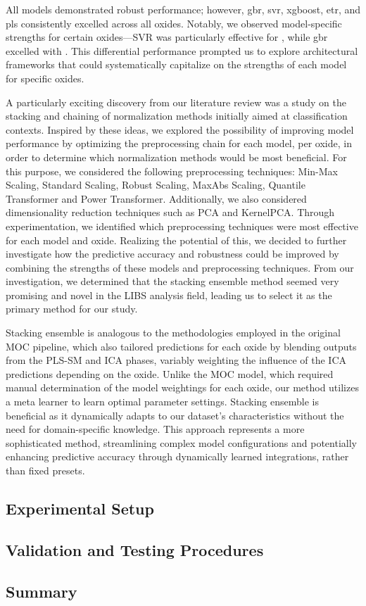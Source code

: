 All models demonstrated robust performance; however, \gls{gbr}, \gls{svr}, \gls{xgboost}, \gls{etr}, and \gls{pls} consistently excelled across all oxides. 
Notably, we observed model-specific strengths for certain oxides—SVR was particularly effective for , while \gls{gbr} excelled with . 
This differential performance prompted us to explore architectural frameworks that could systematically capitalize on the strengths of each model for specific oxides.

A particularly exciting discovery from our literature review was a study on the stacking and chaining of normalization methods initially aimed at classification contexts. 
Inspired by these ideas, we explored the possibility of improving model performance by optimizing the preprocessing chain for each model, per oxide, in order to determine which normalization methods would be most beneficial.
For this purpose, we considered the following preprocessing techniques: Min-Max Scaling, Standard Scaling, Robust Scaling, MaxAbs Scaling, Quantile Transformer and Power Transformer. 
Additionally, we also considered dimensionality reduction techniques such as PCA and KernelPCA.
Through experimentation, we identified which preprocessing techniques were most effective for each model and oxide. 
Realizing the potential of this, we decided to further investigate how the predictive accuracy and robustness could be improved by combining the strengths of these models and preprocessing techniques.
From our investigation, we determined that the stacking ensemble method seemed very promising and novel in the LIBS analysis field, leading us to select it as the primary method for our study.

Stacking ensemble is analogous to the methodologies employed in the original MOC pipeline, which also tailored predictions for each oxide by blending outputs from the PLS-SM and ICA phases, variably weighting the influence of the ICA predictions depending on the oxide.
Unlike the MOC model, which required manual determination of the model weightings for each oxide, our method utilizes a meta learner to learn optimal parameter settings. 
Stacking ensemble is beneficial as it dynamically adapts to our dataset's characteristics without the need for domain-specific knowledge.
This approach represents a more sophisticated method, streamlining complex model configurations and potentially enhancing predictive accuracy through dynamically learned integrations, rather than fixed presets.

\subsection{Experimental Setup}

\subsection{Validation and Testing Procedures}


\subsection{Summary}
